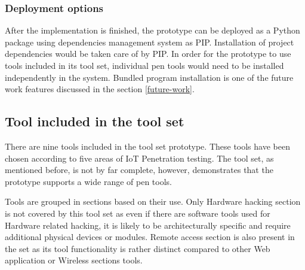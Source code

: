	\subsubsection{Deployment options}
	After the implementation is finished, the prototype can be deployed as a Python package using dependencies management system as PIP. Installation of project dependencies would be taken care of by PIP. In order for the prototype to use tools included in its tool set, individual pen tools would need to be installed independently in the system. Bundled program installation is one of the future work features discussed in the section \ref{future-work}.


\subsection{Tool included in the tool set}
	There are nine tools included in the tool set prototype. These tools have been chosen according to five areas of IoT Penetration testing\cite{cookbook}. The tool set, as mentioned before, is not by far complete, however, demonstrates that the prototype supports a wide range of pen tools. 
	
	Tools are grouped in sections based on their use. Only Hardware hacking section is not covered by this tool set as even if there are software tools used for Hardware related hacking, it is likely to be architecturally specific and require additional physical devices or modules. Remote access section is also present in the set as its tool functionality is rather distinct compared to other Web application or Wireless sections tools.
	
